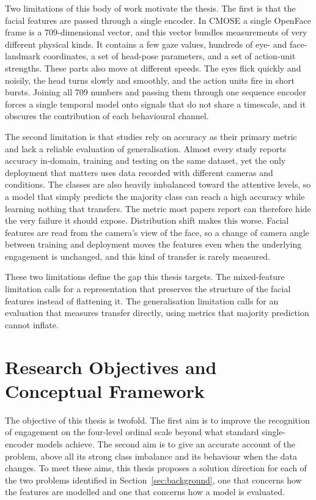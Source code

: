 \documentclass[../main.tex]{subfiles}
\begin{document}
Two limitations of this body of work motivate the thesis. The first is that the facial features are passed through a single encoder. In CMOSE a single OpenFace frame is a 709-dimensional vector, and this vector bundles measurements of very different physical kinds. It contains a few gaze values, hundreds of eye- and face-landmark coordinates, a set of head-pose parameters, and a set of action-unit strengths. These parts also move at different speeds. The eyes flick quickly and noisily, the head turns slowly and smoothly, and the action units fire in short bursts. Joining all 709 numbers and passing them through one sequence encoder forces a single temporal model onto signals that do not share a timescale, and it obscures the contribution of each behavioural channel.

The second limitation is that studies rely on accuracy as their primary metric and lack a reliable evaluation of generalisation. Almost every study reports accuracy in-domain, training and testing on the same dataset, yet the only deployment that matters uses data recorded with different cameras and conditions. The classes are also heavily imbalanced toward the attentive levels, so a model that simply predicts the majority class can reach a high accuracy while learning nothing that transfers. The metric most papers report can therefore hide the very failure it should expose. Distribution shift makes this worse. Facial features are read from the camera's view of the face, so a change of camera angle between training and deployment moves the features even when the underlying engagement is unchanged, and this kind of transfer is rarely measured.

These two limitations define the gap this thesis targets. The mixed-feature limitation calls for a representation that preserves the structure of the facial features instead of flattening it. The generalisation limitation calls for an evaluation that measures transfer directly, using metrics that majority prediction cannot inflate.

\FloatBarrier
\section{Research Objectives and Conceptual Framework}
\label{sec:objectives}

The objective of this thesis is twofold. The first aim is to improve the recognition of engagement on the four-level ordinal scale beyond what standard single-encoder models achieve. The second aim is to give an accurate account of the problem, above all its strong class imbalance and its behaviour when the data changes. To meet these aims, this thesis proposes a solution direction for each of the two problems identified in Section~\ref{sec:background}, one that concerns how the features are modelled and one that concerns how a model is evaluated.
\end{document}
